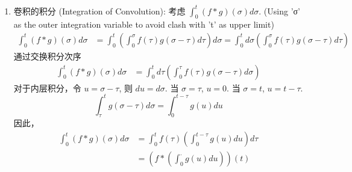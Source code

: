 \documentclass[linespread=1.5,openany]{book}%
\def\diff{d}%
\theoremstyle{plain}
\newcommand{\diff}{\mathop{}\!\mathrm{d}}  %
\begin{document}
{{{{{{\begin{enumerate}[label=(\arabic*)]
									\item 卷积的积分 (Integration of Convolution):
									考虑 $\int_0^t (f*g)(\sigma) \diff \sigma$. (Using 'σ' as the outer integration variable to avoid clash with 't' as upper limit)
									\begin{align*}
										\int_0^t (f*g)(\sigma) \diff \sigma &= \int_0^t \left( \int_0^\sigma f(\tau)g(\sigma-\tau) \diff \tau \right) \diff \sigma=\int_0^t \diff \sigma \left( \int_0^\sigma f(\tau)g(\sigma-\tau) \diff \tau \right) 
									\end{align*}
									通过交换积分次序
									\begin{align*}
										\int_0^t (f*g)(\sigma) \diff \sigma &= \int_0^t \diff \tau \left( \int_0^\tau f(\tau)g(\sigma-\tau) \diff \sigma \right) 
									\end{align*}
									对于内层积分，令 $u = \sigma-\tau$, 则 $\diff u = \diff \sigma$.
									当 $\sigma=\tau$, $u=0$. 当 $\sigma=t$, $u=t-\tau$.
									\[ \int_\tau^t g(\sigma-\tau) \diff \sigma = \int_0^{t-\tau} g(u) \diff u \]
									因此，
									\begin{align}
										\int_0^t (f*g)(\sigma) \diff \sigma &= \int_0^t f(\tau) \left( \int_0^{t-\tau} g(u) \diff u \right) \diff \tau \label{eq:L15_conv_int_final_form} \\
										&= \left(f * \left(\int_0^\cdot g(u)\diff u\right) \right)(t) \nonumber
									\end{align}
									
									
								\end{enumerate}
							} %
							
							
}}}}}
\end{document}
